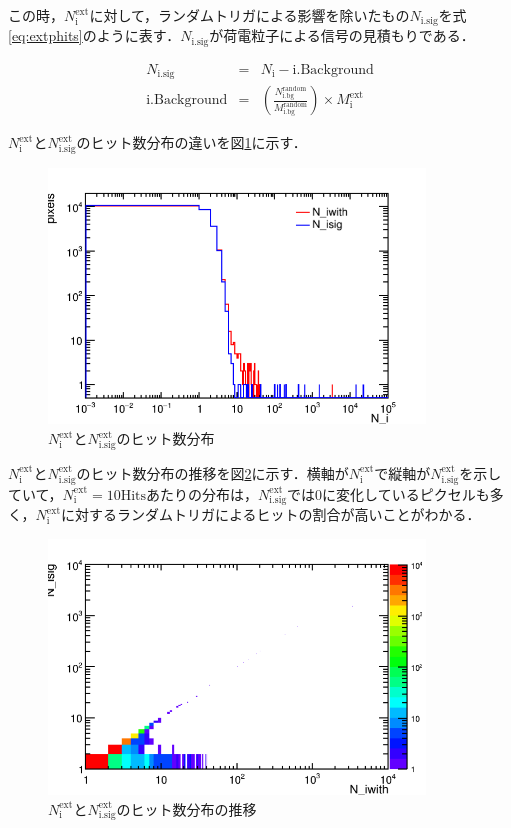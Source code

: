 この時，$N_{\mathrm{i}}^{\mathrm{ext}}$に対して，ランダムトリガによる影響を除いたもの$N_{\mathrm{i.sig}}$を式\ref{eq:extphits}のように表す．$N_{\mathrm{i.sig}}$が荷電粒子による信号の見積もりである．
  
\begin{eqnarray}
  \label{eq:extphits}
  N_{\mathrm{i.sig}} &=& N_{\mathrm{i}} - \mathrm{i.Background} \\
  \mathrm{i.Background} &=& \left(\frac{N_{\mathrm{i.bg}}^{\mathrm{random}}}{M_{\mathrm{i.bg}}^{\mathrm{random}}} \right) \times M_{\mathrm{i}}^{\mathrm{ext}}
\end{eqnarray}

$N_{\mathrm{i}}^{\mathrm{ext}}$と$N_{\mathrm{i.sig}}^{\mathrm{ext}}$のヒット数分布の違いを図\ref{fig:exthitperpix}に示す．
\begin{figure}[h]
  \centering
  \includegraphics[width=10cm]{./figure/exthitperpix.png}
  \caption{$N_{\mathrm{i}}^{\mathrm{ext}}$と$N_{\mathrm{i.sig}}^{\mathrm{ext}}$のヒット数分布}
  \label{fig:exthitperpix}
\end{figure}

$N_{\mathrm{i}}^{\mathrm{ext}}$と$N_{\mathrm{i.sig}}^{\mathrm{ext}}$のヒット数分布の推移を図\ref{fig:exthitperpixbfaf}に示す．横軸が$N_{\mathrm{i}}^{\mathrm{ext}}$で縦軸が$N_{\mathrm{i.sig}}^{\mathrm{ext}}$を示していて，$N_{\mathrm{i}}^{\mathrm{ext}}=10 \mathrm{Hits}$あたりの分布は，$N_{\mathrm{i.sig}}^{\mathrm{ext}}$では0に変化しているピクセルも多く，$N_{\mathrm{i}}^{\mathrm{ext}}$に対するランダムトリガによるヒットの割合が高いことがわかる．
\begin{figure}[h]
  \centering
  \includegraphics[width=10cm]{./figure/exthitperpixbfaf.png}
  \caption{$N_{\mathrm{i}}^{\mathrm{ext}}$と$N_{\mathrm{i.sig}}^{\mathrm{ext}}$のヒット数分布の推移}
  \label{fig:exthitperpixbfaf}
\end{figure}

